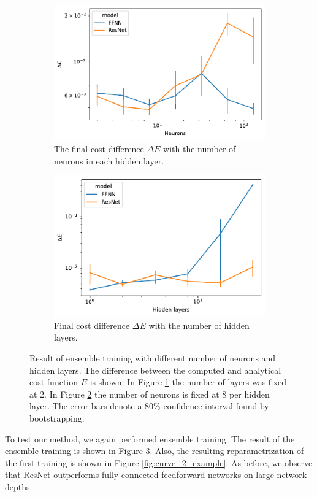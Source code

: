 \begin{figure}[b]
    \begin{subfigure}[t]{0.5\textwidth}
        \centering
        \includegraphics[width=\linewidth]{figures/curve_2/exp_6/neurons_error.pdf}
        \caption{The final cost difference \(\Delta E\) with the number of neurons in each hidden layer.} \label{fig:curve_2_neuron_error}
    \end{subfigure}
    \begin{subfigure}[t]{0.5\textwidth}
        \centering
        \includegraphics[width=\linewidth]{figures/curve_2/exp_6/layer_error.pdf}
        \caption{Final cost  difference \(\Delta E\) with the number of hidden layers.} \label{fig:curve_2_layer_error}
    \end{subfigure}
    \caption{Result of ensemble training with different number of neurons and hidden layers. The difference between the computed and analytical cost function \(E\) is shown. In Figure \ref{fig:curve_2_neuron_error} the number of layers was fixed at 2. In Figure \ref{fig:curve_2_layer_error} the number of neurons is fixed at 8 per hidden layer. The error bars denote a 80\% confidence interval found by bootstrapping.} \label{fig:curve_2_parmas_eks}
\end{figure}

To test our method, we again performed ensemble training. The result of the ensemble training is shown in Figure \ref{fig:curve_2_parmas_eks}. Also, the resulting reparametrization of the first training is shown in Figure \ref{fig:curve_2_example}. As before, we observe that ResNet outperforms fully connected feedforward networks on large network depths. 
